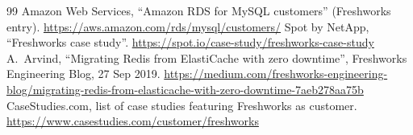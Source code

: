 \documentclass[10pt,a4paper]{article}
\begin{document}
\begin{thebibliography}{99}
 Amazon Web Services, ``Amazon RDS for MySQL customers'' (Freshworks entry). \url{https://aws.amazon.com/rds/mysql/customers/}
 Spot by NetApp, ``Freshworks case study''. \url{https://spot.io/case-study/freshworks-case-study}
 A.~Arvind, ``Migrating Redis from ElastiCache with zero downtime'', Freshworks Engineering Blog, 27 Sep 2019. \url{https://medium.com/freshworks-engineering-blog/migrating-redis-from-elasticache-with-zero-downtime-7aeb278aa75b}
 CaseStudies.com, list of case studies featuring Freshworks as customer. \url{https://www.casestudies.com/customer/freshworks}
\end{thebibliography}
\end{document}
